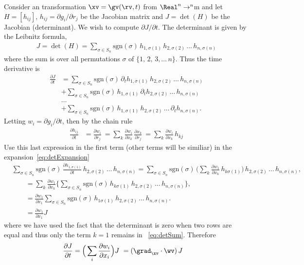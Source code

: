 \documentclass[11pt]{article}
\begin{document}
Consider an transformation $\xv=\gv(\rv,t)$ from $\Real^n\rightarrow \real^n$m and let $H=[h_{ij}]$, $h_{ij}=\partial g_i/\partial r_j$ be the Jacobian matrix and
$J=\det(H)$ be the Jacobian (determinant). 
We wish to compute $\partial J/\partial t$. 
The determinant is given by the Leibnitz formula, 
\begin{align*}
    J =  \det(H) = \sum_{\sigma\in S_n} \text{sgn}(\sigma) \, h_{1,\sigma(1)}\, h_{2,\sigma(2)}\, \ldots \, h_{n,\sigma(n)} 
\end{align*}
where the sum is over all permutations $\sigma$ of $\{ 1,\, 2,\, 3,\ldots\, n\}$. 
Thus the time derivative is 
\begin{align}
   \frac{\partial J}{\partial t} &=   
        \sum_{\sigma\in S_n} \text{sgn}(\sigma) \, \partial_t h_{1,\sigma(1)}\, h_{2,\sigma(2)}\, \ldots \, h_{n,\sigma(n)}  \label{eq:detExpansion} \\
      & +\sum_{\sigma\in S_n} \text{sgn}(\sigma) \,  h_{1,\sigma(1)}\, \partial_t h_{2,\sigma(2)}\, \ldots \, h_{n,\sigma(n)} \\
      & \ldots \\
      & + \sum_{\sigma\in S_n} \text{sgn}(\sigma) \,  h_{1,\sigma(1)}\, h_{2,\sigma(2)}\, \ldots \, \partial_t h_{n,\sigma(n)} . 
\end{align}
Letting $w_i=\partial g_i/\partial t$, then by the chain rule
\begin{align*}
  \frac{\partial h_{ij}}{\partial t} &= \frac{\partial w_i}{\partial r_j} ~
                                     = \sum_k \frac{\partial w_i}{\partial x_k} \, \frac{\partial x_k}{\partial r_j} ~
                                     = \sum_k \frac{\partial w_i}{\partial x_k} \, h_{kj}
\end{align*}
Use this last expression in the first term (other terms will be similiar) in the expansion~\eqref{eq:detExpansion}
\begin{align}
&    \sum_{\sigma\in S_n} \text{sgn}(\sigma) \, \frac{\partial h_{1,\sigma(1)}}{\partial t}\, h_{2,\sigma(2)}\, \ldots \, h_{n,\sigma(n)} 
 = \sum_{\sigma\in S_n} \text{sgn}(\sigma) \, \big(\sum_k \frac{\partial w_1}{\partial x_k} \, h_{k\sigma(1)}\big) \, h_{2,\sigma(2)}\, \ldots \, h_{n,\sigma(n)} , \\
&\qquad =  \sum_k \frac{\partial w_1}{\partial x_k} \Big\{ \sum_{\sigma\in S_n} \text{sgn}(\sigma) \, h_{k\sigma(1)} \, h_{2,\sigma(2)}\, \ldots \, h_{n,\sigma(n)} \Big\} , \label{eq:detSum} \\
&\qquad = \frac{\partial w_1}{\partial x_1} \sum_{\sigma\in S_n} \text{sgn}(\sigma) \, h_{1\sigma(1)} \, h_{2,\sigma(2)}\, \ldots \, h_{n,\sigma(n)} . \\
&\qquad = \frac{\partial w_1}{\partial x_1} J 
\end{align}
where we have used the fact that the determinant is zero when two rows are equal and thus only the term $k=1$ remains in ~\eqref{eq:detSum}. 
Therefore
\begin{align}
\frac{\partial J}{\partial t} &= \Big(\sum_i \frac{\partial w_i}{\partial x_i} \Big) J  ~= (\grad_{\xv}\cdot\wv) \, J
\end{align}
\end{document}
